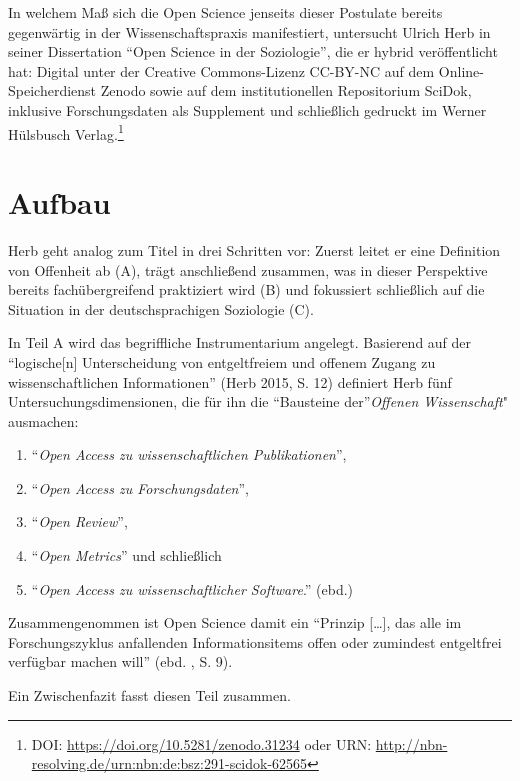 \documentclass[a4paper,
fontsize=11pt,
oneside,
numbers=noperiodatend,
parskip=half-,
bibliography=totoc,
final
]{scrartcl}
\begin{document}
In welchem Maß sich die Open Science jenseits dieser Postulate bereits
gegenwärtig in der Wissenschaftspraxis manifestiert, untersucht Ulrich
Herb in seiner Dissertation \enquote{Open Science in der Soziologie},
die er hybrid veröffentlicht hat: Digital unter der Creative
Commons-Lizenz CC-BY-NC auf dem Online-Speicherdienst Zenodo sowie auf
dem institutionellen Repositorium SciDok, inklusive Forschungsdaten als
Supplement und schließlich gedruckt im Werner Hülsbusch
Verlag.\footnote{DOI: \url{https://doi.org/10.5281/zenodo.31234} oder
  URN: \url{http://nbn-resolving.de/urn:nbn:de:bsz:291-scidok-62565}}

\section*{Aufbau}\label{aufbau}

Herb geht analog zum Titel in drei Schritten vor: Zuerst leitet er eine
Definition von Offenheit ab (A), trägt anschließend zusammen, was in
dieser Perspektive bereits fachübergreifend praktiziert wird (B) und
fokussiert schließlich auf die Situation in der deutschsprachigen
Soziologie (C).

In Teil A wird das begriffliche Instrumentarium angelegt. Basierend auf
der \enquote{logische{[}n{]} Unterscheidung von entgeltfreiem und
offenem Zugang zu wissenschaftlichen Informationen} (Herb 2015, S. 12)
definiert Herb fünf Untersuchungsdimensionen, die für ihn die
\enquote{Bausteine der}\emph{Offenen Wissenschaft}" ausmachen:

\begin{enumerate}
\def\labelenumi{\arabic{enumi}.}
\item
  \enquote{\emph{Open Access zu wissenschaftlichen Publikationen}},
\item
  \enquote{\emph{Open Access zu Forschungsdaten}},
\item
  \enquote{\emph{Open Review}},
\item
  \enquote{\emph{Open Metrics}} und schließlich
\item
  \enquote{\emph{Open Access zu wissenschaftlicher Software}.} (ebd.)
\end{enumerate}

Zusammengenommen ist Open Science damit ein \enquote{Prinzip
{[}\ldots{}{]}, das alle im Forschungszyklus anfallenden
Informationsitems offen oder zumindest entgeltfrei verfügbar machen
will} (ebd. , S. 9).

Ein Zwischenfazit fasst diesen Teil zusammen.
\end{document}
